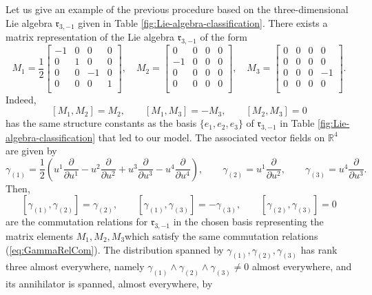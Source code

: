 \documentclass[12pt]{article}
\theoremstyle{plain}
\theoremstyle{definition}
\numberwithin{equation}{section}
\begin{document}
Let us give an example of the previous procedure based on the three-dimensional Lie algebra $\mathfrak{r}_{3,-1}$ given in Table \ref{fig:Lie-algebra-classification}. There exists a matrix representation of the Lie algebra $\mathfrak{r}_{3,-1}$ of the form
$$
M_1=
\frac 12\left[\begin{array}{cccc}
-1&0&0&0\\
0&1&0&0\\
0&0&-1&0\\
0&0&0&1\\
\end{array}\right],\quad M_2=\left[\begin{array}{cccc}
0&0&0&0\\
-1&0&0&0\\
0&0&0&0\\
0&0&0&0\\
\end{array}\right],\quad M_3=\left[\begin{array}{cccc}
0&0&0&0\\
0&0&0&0\\
0&0&0&-1\\
0&0&0&0\\
\end{array}\right].
$$
Indeed,
$$
[M_1,M_2]=M_2,\qquad [M_1,M_3]=-M_3,\qquad [M_2,M_3]=0
$$
has the same structure constants as the basis $\{e_1,e_2,e_3\}$ of $\mathfrak{r}_{3,-1}$  in Table \ref{fig:Lie-algebra-classification} that led to our model.
The associated vector fields on $\mathbb{R}^4$ are given by
\begin{equation}\label{eq:Gamma3}
\gamma_{(1)}=\frac 12\left(u^1\frac{\partial}{\partial u^1}-u^2\frac{\partial}{\partial u^2}+u^3\frac{\partial}{\partial u^3}-u^4\frac{\partial}{\partial u^4}\right),\qquad \gamma_{(2)}=u^1\frac{\partial}{\partial u^2},\qquad \gamma_{(3)}=u^4\frac{\partial}{\partial u^3}.
\end{equation}
Then,
\begin{equation}\label{eq:GammaRelCom}
[\gamma_{(1)},\gamma_{(2)}]=\gamma_{(2)},\qquad [\gamma_{(1)},\gamma_{(3)}]=-\gamma_{(3)},\qquad [\gamma_{(2)},\gamma_{(3)}]=0
\end{equation}
are the commutation relations for $\mathfrak{r}_{3,-1}$ in the chosen basis representing the matrix elements $M_1,M_2,M_3$which satisfy the same commutation relations (\ref{eq:GammaRelCom}). The distribution spanned by $\gamma_{(1)},\gamma_{(2)},\gamma_{(3)}$ has rank three almost everywhere, namely $\gamma_{(1)}\wedge\gamma_{(2)}\wedge\gamma_{(3)}\neq 0$ almost everywhere, and its annihilator is spanned, almost everywhere, by
\end{document}
